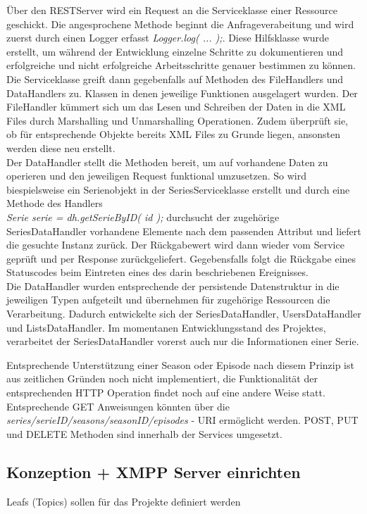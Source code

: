 Über den RESTServer wird ein Request an die Serviceklasse einer Ressource geschickt. Die angesprochene Methode beginnt die Anfrageverabeitung und wird zuerst durch einen Logger erfasst \textit{  Logger.log( ... );}. Diese Hilfsklasse wurde erstellt, um während der Entwicklung einzelne Schritte zu dokumentieren und erfolgreiche und nicht erfolgreiche Arbeitsschritte genauer bestimmen zu können. Die Serviceklasse greift dann gegebenfalls auf Methoden des FileHandlers und DataHandlers zu. Klassen in denen jeweilige Funktionen ausgelagert wurden. Der FileHandler kümmert sich um das Lesen und Schreiben der Daten in die XML Files durch Marshalling und Unmarshalling Operationen. Zudem überprüft sie, ob für entsprechende Objekte bereits XML Files zu Grunde liegen, ansonsten werden diese neu erstellt. \\
Der DataHandler stellt die Methoden bereit, um auf vorhandene Daten zu operieren und den jeweiligen Request funktional umzusetzen. So wird biespielsweise ein Serienobjekt in der SeriesServiceklasse erstellt und durch eine Methode des Handlers \\\textit{      Serie serie = dh.getSerieByID( id ); } durchsucht der zugehörige SeriesDataHandler  vorhandene Elemente nach dem passenden Attribut und liefert die gesuchte Instanz zurück. Der Rückgabewert wird dann wieder vom Service geprüft und per Response zurückgeliefert. Gegebensfalls folgt die Rückgabe eines Statuscodes beim Eintreten eines des darin beschriebenen Ereignisses.\\
Die DataHandler wurden entsprechende der persistende Datenstruktur in die jeweiligen Typen aufgeteilt und übernehmen für zugehörige Ressourcen die Verarbeitung. Dadurch entwickelte sich der SeriesDataHandler, UsersDataHandler und ListsDataHandler. Im momentanen Entwicklungsstand des Projektes, verarbeitet der SeriesDataHandler vorerst auch nur die Informationen einer Serie.

\newpage
Entsprechende Unterstützung einer Season oder Episode nach diesem Prinzip ist aus zeitlichen Gründen noch nicht implementiert, die Funktionalität der entsprechenden HTTP Operation findet noch auf eine andere Weise statt. Entsprechende GET Anweisungen könnten über die \textit{series/{serieID}/seasons/{seasonID}/episodes} - URI ermöglicht werden. POST, PUT und DELETE Methoden sind innerhalb der Services umgesetzt.




\newpage

\subsection{Konzeption + XMPP Server einrichten}
Leafs (Topics) sollen für das Projekte definiert werden

